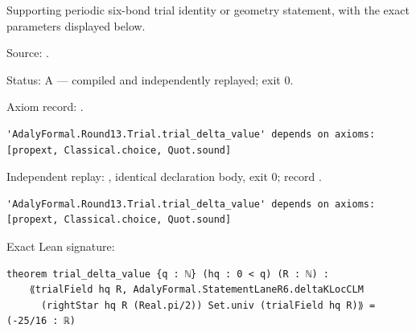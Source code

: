 \begin{theorem}[bp-426]
\label{bp-426}
\leanok
Supporting periodic six-bond trial identity or geometry statement, with the exact parameters displayed below.

\par Source: \texttt{}.
\par Status: A — compiled and independently replayed; exit 0.
\par Axiom record: \texttt{}.
\begin{verbatim}
'AdalyFormal.Round13.Trial.trial_delta_value' depends on axioms: [propext, Classical.choice, Quot.sound]
\end{verbatim}
\par Independent replay: \texttt{}, identical declaration body, exit 0; record \texttt{}.
\begin{verbatim}
'AdalyFormal.Round13.Trial.trial_delta_value' depends on axioms: [propext, Classical.choice, Quot.sound]
\end{verbatim}
\par Exact Lean signature:
\begin{verbatim}
theorem trial_delta_value {q : ℕ} (hq : 0 < q) (R : ℕ) :
    ⟪trialField hq R, AdalyFormal.StatementLaneR6.deltaKLocCLM
      (rightStar hq R (Real.pi/2)) Set.univ (trialField hq R)⟫ = (-25/16 : ℝ)
\end{verbatim}
\end{theorem}

